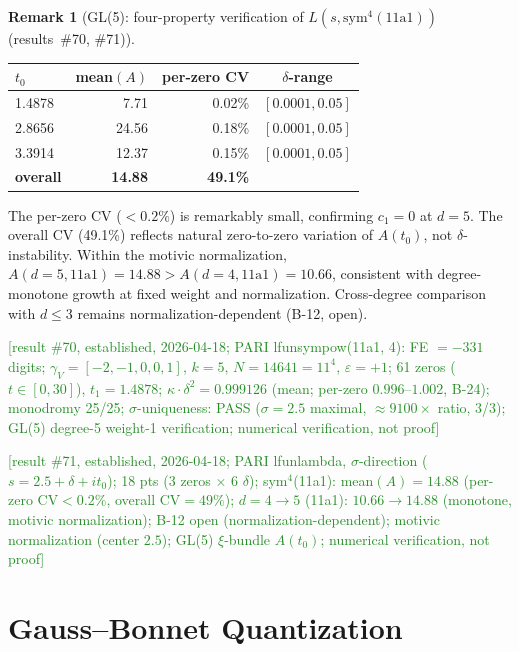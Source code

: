 \documentclass[11pt, a4paper]{article}
\theoremstyle{definition}
\newtheorem{remark}{Remark}[section]
\theoremstyle{plain}
\begin{document}
\begin{remark}[GL(5): four-property verification of $L(s, \mathrm{sym}^4(11\mathrm{a}1))$ (results~\#70, \#71)]
\begin{center}
\small
\begin{tabular}{@{}lrrc@{}}
\toprule
$t_0$ & mean$(A)$ & per-zero CV & $\delta$-range \\
\midrule
1.4878 & 7.71 & 0.02\% & $[0.0001, 0.05]$ \\
2.8656 & 24.56 & 0.18\% & $[0.0001, 0.05]$ \\
3.3914 & 12.37 & 0.15\% & $[0.0001, 0.05]$ \\
\midrule
\textbf{overall} & \textbf{14.88} & \textbf{49.1\%} & \\
\bottomrule
\end{tabular}
\end{center}

\noindent The per-zero CV ($< 0.2\%$) is remarkably small, confirming
$c_1 = 0$ at $d = 5$.  The overall CV (49.1\%) reflects natural zero-to-zero
variation of $A(t_0)$, not $\delta$-instability.
Within the motivic normalization, $A(d=5, \mathrm{11a1}) = 14.88 > A(d=4, \mathrm{11a1}) = 10.66$,
consistent with degree-monotone growth at fixed weight and normalization.
Cross-degree comparison with $d \leq 3$ remains normalization-dependent (B-12, open).

\textcolor{ForestGreen}{[result \#70, established, 2026-04-18;
PARI lfunsympow(11a1, 4): FE ${=}-331$ digits;
$\gamma_V{=}[-2,-1,0,0,1]$, $k{=}5$, $N{=}14641{=}11^4$, $\varepsilon{=}+1$;
61 zeros ($t{\in}[0,30]$), $t_1{=}1.4878$;
$\kappa{\cdot}\delta^2{=}0.999126$ (mean; per-zero $0.996$--$1.002$, B-24); monodromy 25/25;
$\sigma$-uniqueness: PASS ($\sigma{=}2.5$ maximal, ${\approx}9100\times$ ratio, 3/3);
GL(5) degree-5 weight-1 verification; numerical verification, not proof]}

\textcolor{ForestGreen}{[result \#71, established, 2026-04-18;
PARI lfunlambda, $\sigma$-direction ($s{=}2.5{+}\delta{+}it_0$); 18 pts (3 zeros ${\times}$ 6 $\delta$);
sym$^4$(11a1): mean$(A){=}14.88$ (per-zero CV${<}0.2\%$, overall CV${=}49\%$);
$d{=}4{\to}5$ (11a1): $10.66{\to}14.88$ (monotone, motivic normalization);
B-12 open (normalization-dependent); motivic normalization (center $2.5$);
GL(5) $\xi$-bundle $A(t_0)$; numerical verification, not proof]}
\end{remark}


\section{Gauss--Bonnet Quantization}
\label{sec:gauss_bonnet_thm}
\end{document}
